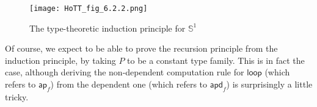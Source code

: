\documentclass[12pt]{article}
\newcommand{\base}{\ensuremath{\mathsf{base}}\xspace}
\newcommand{\lloop}{\ensuremath{\mathsf{loop}}\xspace}
\newcommand{\mapdepfunc}[1]{\ensuremath{\mathsf{apd}_{#1}}\xspace}
\newcommand{\mapfunc}[1]{\ensuremath{\mathsf{ap}_{#1}}\xspace}
\newcommand{\Sn}{\mathbb{S}}
\newcommand{\trans}[2]{\ensuremath{{#1}_{*}\mathopen{}\left({#2}\right)\mathclose{}}\xspace}
\let\apdfunc\mapdepfunc
\let\apfunc\mapfunc
\begin{document}
\begin{figure}
  \centering
\texttt{[image: HoTT\_fig\_6.2.2.png]}
  \caption{The type-theoretic induction principle for $\Sn^1$}
  \label{fig:ttS1ind}
\end{figure}

Of course, we expect to be able to prove the recursion principle from the induction principle, by taking $P$ to be a constant type family.
This is in fact the case, although deriving the non-dependent computation rule for $\lloop$ (which refers to $\apfunc f$) from the dependent one (which refers to $\apdfunc f$) is surprisingly a little tricky.
\end{document}

